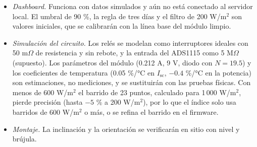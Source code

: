 \documentclass[10pt,letterpaper,twocolumn]{article}
\begin{document}
\begin{itemize}
\item \emph{Dashboard.} Funciona con datos simulados y aún no está conectado al servidor local. El umbral de 90 \%, la regla de tres días y el filtro de 200 W/m$^2$ son valores iniciales, que se calibrarán con la línea base del módulo limpio.
\item \emph{Simulación del circuito.} Los relés se modelan como interruptores ideales con 50 m$\Omega$ de resistencia y sin rebote, y la entrada del ADS1115 como 5 M$\Omega$ (supuesto). Los parámetros del módulo (0.212 A, 9 V, diodo con $N=19.5$) y los coeficientes de temperatura (0.05 \%/°C en $I_\mathrm{sc}$, $-0.4$ \%/°C en la potencia) son estimaciones, no mediciones, y se sustituirán con las pruebas físicas. Con menos de 600 W/m$^2$ el barrido de 23 puntos, calculado para 1\,000 W/m$^2$, pierde precisión (hasta $-5$ \% a 200 W/m$^2$), por lo que el índice solo usa barridos de 600 W/m$^2$ o más, o se refina el barrido en el firmware.
\item \emph{Montaje.} La inclinación y la orientación se verificarán en sitio con nivel y brújula.
\end{itemize}
\end{document}
